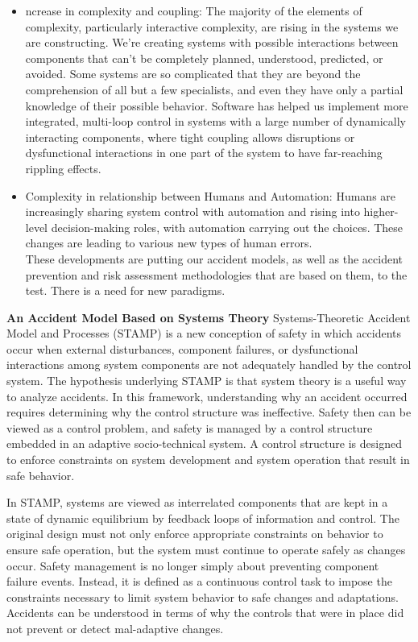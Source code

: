 \begin{itemize}
	\item ncrease in complexity and coupling: The majority of the elements of complexity, particularly interactive complexity, are rising in the systems we are constructing. We're creating systems with possible interactions between components that can't be completely planned, understood, predicted, or avoided. Some systems are so complicated that they are beyond the comprehension of all but a few specialists, and even they have only a partial knowledge of their possible behavior. Software has helped us implement more integrated, multi-loop control in systems with a large number of dynamically interacting components, where tight coupling allows disruptions or dysfunctional interactions in one part of the system to have far-reaching rippling effects.
	\item Complexity in relationship between Humans and Automation: Humans are increasingly sharing system control with automation and rising into higher-level decision-making roles, with automation carrying out the choices. These changes are leading to various new types of human errors.\\
These developments are putting our accident models, as well as the accident prevention and risk assessment methodologies that are based on them, to the test. There is a need for new paradigms.
	
\end{itemize}


\textbf{An Accident Model Based on Systems Theory}
Systems-Theoretic Accident Model and Processes (STAMP) is a new conception of safety in which accidents occur when external disturbances, component failures, or dysfunctional interactions among system components are not adequately handled by the control system. The hypothesis underlying STAMP is that system theory is a useful way to analyze accidents. In this framework, understanding why an accident occurred requires determining why the control structure was ineffective. Safety then can be viewed as a control problem, and safety is managed by a control structure embedded in an adaptive socio-technical system. A control structure is designed to enforce constraints on system development and system operation that result in safe behavior.



In STAMP, systems are viewed as interrelated components that are kept in a state of dynamic equilibrium by feedback loops of information and control. The original design must not only enforce appropriate constraints on behavior to ensure safe operation, but the system must continue to operate safely as changes occur. Safety management is no longer simply about preventing component failure events. Instead, it is defined as a continuous control task to impose the constraints necessary to limit system behavior to safe changes and adaptations. Accidents can be understood in terms of why the controls that were in place did not prevent or detect mal-adaptive changes.



